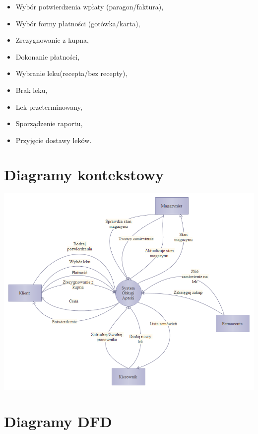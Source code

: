 \documentclass[a4paper, 11pt]{article}
\begin{document}
	\begin{itemize}
	\item Wybór potwierdzenia wpłaty (paragon/faktura),
	\item Wybór formy płatności (gotówka/karta),
	\item Zrezygnowanie z kupna,
	\item Dokonanie płatności,
	\item Wybranie leku(recepta/bez recepty),
	\item Brak leku,
	\item Lek przeterminowany,
	\item Sporządzenie raportu,
	\item Przyjęcie dostawy leków.
	\end{itemize}
	

	\section{Diagramy kontekstowy}
	\includegraphics[scale=0.8]{zd.PNG} 
	\section{Diagramy DFD}
\end{document}
